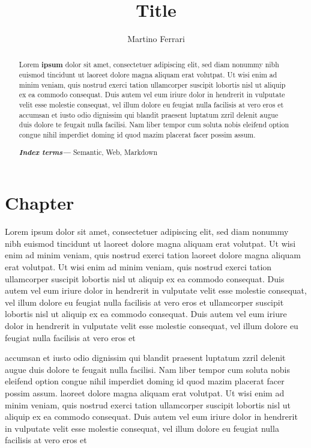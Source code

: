 \documentclass[a4paper,10pt]{article}
\author{Martino Ferrari}
\providecommand{\keywords}[1]{\textbf{\textit{Index terms---}} #1}\title{Title}
\begin{document}
\maketitle
\begin{abstract}

Lorem \textbf{ipsum}
dolor sit amet, consectetuer adipiscing elit, sed diam nonummy nibh euismod tincidunt ut
laoreet dolore magna aliquam erat volutpat. Ut wisi enim ad minim veniam, quis nostrud exerci tation
ullamcorper suscipit lobortis nisl ut aliquip ex ea commodo consequat. Duis autem vel eum iriure dolor in hendrerit in
vulputate velit esse molestie consequat, vel illum dolore eu feugiat nulla facilisis at vero eros et
accumsan et iusto odio dignissim qui blandit praesent luptatum zzril delenit augue duis dolore te feugait nulla facilisi.
Nam liber tempor cum soluta nobis eleifend option congue nihil imperdiet doming id quod mazim placerat facer possim assum.

\keywords{Semantic, Web, Markdown}
\end{abstract}

\tableofcontents
\section{Chapter}

Lorem ipsum
dolor sit amet, consectetuer adipiscing elit, sed diam nonummy nibh euismod tincidunt ut
laoreet dolore magna aliquam erat volutpat. Ut wisi enim ad minim veniam, quis nostrud exerci tation
laoreet dolore magna aliquam erat volutpat. Ut wisi enim ad minim veniam, quis nostrud exerci tation
ullamcorper suscipit lobortis nisl ut aliquip ex ea commodo consequat. Duis autem vel eum iriure dolor in hendrerit in
vulputate velit esse molestie consequat, vel illum dolore eu feugiat nulla facilisis at vero eros et
ullamcorper suscipit lobortis nisl ut aliquip ex ea commodo consequat. Duis autem vel eum iriure dolor in hendrerit in
vulputate velit esse molestie consequat, vel illum dolore eu feugiat nulla facilisis at vero eros et



accumsan et iusto odio dignissim qui blandit praesent luptatum zzril delenit augue duis dolore te feugait nulla facilisi.
Nam liber tempor cum soluta nobis eleifend option congue nihil imperdiet doming id quod mazim placerat facer possim assum.
laoreet dolore magna aliquam erat volutpat. Ut wisi enim ad minim veniam, quis nostrud exerci tation
ullamcorper suscipit lobortis nisl ut aliquip ex ea commodo consequat. Duis autem vel eum iriure dolor in hendrerit in
vulputate velit esse molestie consequat, vel illum dolore eu feugiat nulla facilisis at vero eros et
\end{document}
